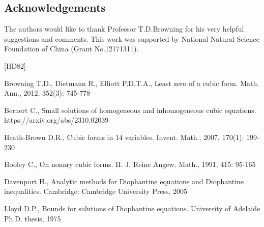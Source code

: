 \documentclass[12pt]{amsart}
\theoremstyle{definition}
\numberwithin{equation}{section}
\begin{document}
\subsection*{Acknowledgements}
The authors would like to thank Professor T.D.Browning for his very helpful suggestions and comments.
This work was supported by National Natural Science Foundation of China (Grant No.12171311).



\normalsize


\begin{thebibliography}{[HD82]}




\normalsize
\baselineskip=17pt




Browning T.D., Dietmann R., Elliott P.D.T.A., 
Least zero of a cubic form.
Math. Ann., 2012, 352(3): 745-778

Bernert C.,
Small solutions of homogeneous and inhomogeneous cubic equations.
https://arxiv.org/abs/2310.02039

Heath-Brown D.R.,
Cubic forms in $14$ variables.
Invent. Math., 2007, 170(1):
199-230

Hooley C.,
On nonary cubic forms. {II}. 
J. Reine Angew. Math., 1991, 415: 95-165

Davenport H.,
Analytic methods for Diophantine equations and Diophantine inequalities.
Cambridge: Cambridge University Press, 2005

Lloyd D.P., 
Bounds for solutions of Diophantine equations.
University of Adelaide Ph.D. thesis, 1975




\end{thebibliography}
\end{document}
